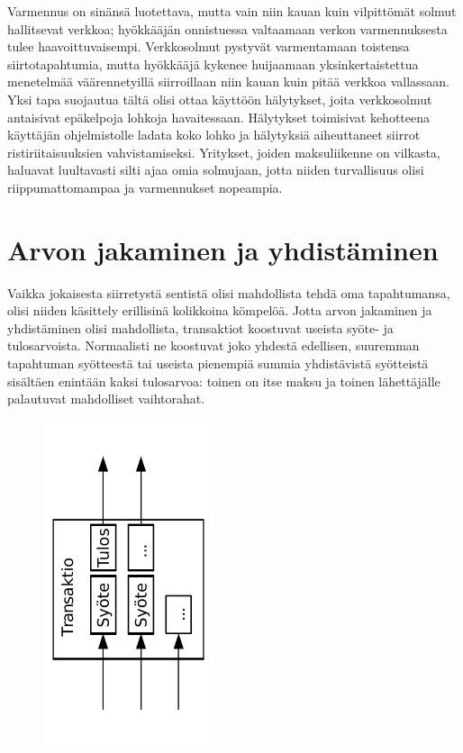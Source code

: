 \documentclass{article}
\begin{document}
Varmennus on sinänsä luotettava, mutta vain niin kauan kuin vil\-pit\-tö\-mät solmut hallitsevat verkkoa; hyökkääjän onnistuessa valtaamaan verkon varmennuksesta tulee haavoittuvaisempi. Verkkosolmut pystyvät varmentamaan toistensa siirtotapahtumia, mutta hyökkääjä kykenee huijaamaan yksinkertaistettua menetelmää väärennetyillä siirroillaan niin kauan kuin pitää verkkoa vallassaan. Yksi tapa suojautua tältä olisi ottaa käyttöön hälytykset, joita verkkosolmut antaisivat epäkelpoja lohkoja havaitessaan. Hälytykset toimisivat kehotteena käyttäjän ohjelmistolle ladata koko lohko ja hälytyksiä aiheuttaneet siirrot ristiriitaisuuksien vahvistamiseksi. Yritykset, joiden maksuliikenne on vilkasta, haluavat luultavasti silti ajaa omia solmujaan, jotta niiden turvallisuus olisi riippumattomampaa ja varmennukset nopeampia.
\newpage
\section{Arvon jakaminen ja yhdistäminen}

Vaikka jokaisesta siirretystä sentistä olisi mahdollista tehdä oma tapahtumansa, olisi niiden käsittely erillisinä kolikkoina kömpelöä. Jotta arvon jakaminen ja yhdistäminen olisi mahdollista, transaktiot koostuvat useista syöte- ja tulosarvoista. Normaalisti ne koostuvat joko yhdestä edellisen, suuremman tapahtuman syötteestä tai useista pienempiä summia yhdistävistä syötteistä sisältäen enintään kaksi tulosarvoa: toinen on itse maksu ja toinen lähettäjälle palautuvat mahdolliset vaihtorahat.

\begin{figure}[H]
    \centering
    \includegraphics[angle=270,width=5cm]{figures/fig6.pdf}
\end{figure}
\end{document}
